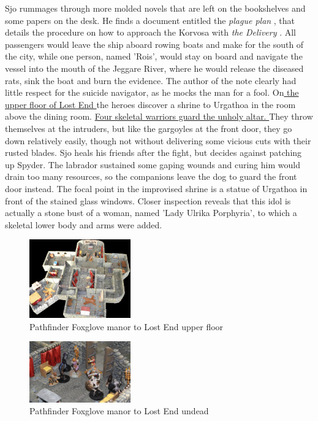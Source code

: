 Sjo rummages through more molded novels that are left on the bookshelves and some papers on the desk. He finds a document entitled the {\itshape plague plan} , that details the procedure on how to approach the Korvosa with  {\itshape the Delivery} . All passengers would leave the ship aboard rowing boats and make for the south of the city, while one person, named 'Rois', would stay on board and navigate the vessel into the mouth of the Jeggare River, where he would release the diseased rats, sink the boat and burn the evidence. The author of the note clearly had little respect for the suicide navigator, as he mocks the man for a fool. On\hyperref[fig:Pathfinder-Foxglove-manor-to-Lost-End-upper-floor-513924264]{ the upper floor of Lost End } the heroes discover a shrine to Urgathoa in the room above the dining room. \hyperref[fig:Pathfinder-Foxglove-manor-to-Lost-End-undead-513925444]{ Four skeletal warriors guard the unholy altar. } They throw themselves at the intruders, but like the gargoyles at the front door, they go down relatively easily, though not without delivering some vicious cuts with their rusted blades. Sjo heals his friends after the fight, but decides against patching up Spyder. The labrador sustained some gaping wounds and curing him would drain too many resources, so the companions leave the dog to guard the front door instead. The focal point in the improvised shrine is a statue of Urgathoa in front of the stained glass windows. Closer inspection reveals that this idol is actually a stone bust of a woman, named 'Lady Ulrika Porphyria', to which a skeletal lower body and arms were added. \\

\begin{figure}[h]
	\centering
	\includegraphics[width=0.39\textwidth]{images/Pathfinder-Foxglove-manor-to-Lost-End-upper-floor-513924264.jpg}
	\caption{Pathfinder Foxglove manor to Lost End upper floor}
	\label{fig:Pathfinder-Foxglove-manor-to-Lost-End-upper-floor-513924264}
\end{figure}

\begin{figure}[h]
	\centering
	\includegraphics[width=0.39\textwidth]{images/Pathfinder-Foxglove-manor-to-Lost-End-undead-513925444.jpg}
	\caption{Pathfinder Foxglove manor to Lost End undead}
	\label{fig:Pathfinder-Foxglove-manor-to-Lost-End-undead-513925444}
\end{figure}


